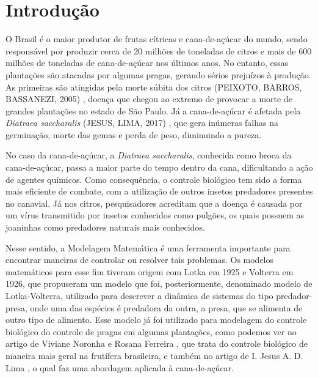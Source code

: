 \maketitle

\section{Introdução}

O Brasil é o maior produtor de frutas cítricas e cana-de-açúcar do mundo, sendo responsável por produzir cerca de 20 milhões de toneladas de citros e mais de 600 milhões de toneladas de cana-de-açúcar nos últimos anos. No entanto, essas plantações são atacadas por algumas pragas, gerando sérios prejuízos à produção. As primeiras são atingidas pela morte súbita dos citros (PEIXOTO,
BARROS, BASSANEZI, 2005) \cite{mp_lb_rb_2005}, doença que chegou ao extremo de provocar a morte de grandes plantações no estado de São Paulo. Já a cana-de-açúcar é afetada pela \textit{Diatraea saccharalis} (JESUS, LIMA, 2017) \cite{ij_al_2017}, que gera inúmeras falhas na germinação, morte das gemas e perda de peso, diminuindo a pureza.

No caso da cana-de-açúcar, a \textit{Diatraea saccharalis}, conhecida como broca da cana-de-açúcar, passa a maior parte do tempo dentro da cana, dificultando a ação de agentes químicos. Como consequência, o controle biológico tem sido a forma mais eficiente de combate, com a utilização de outros insetos predadores presentes no canavial. Já nos citros, pesquisadores acreditam que a doença é causada por um vírus transmitido por insetos conhecidos como pulgões, os quais possuem as joaninhas como predadores naturais mais conhecidos.

Nesse sentido, a Modelagem Matemática é uma ferramenta importante para encontrar maneiras de controlar ou resolver tais problemas. Os modelos matemáticos para esse fim tiveram origem com Lotka em 1925 e Volterra em 1926, que propuseram um modelo que foi, posteriormente, denominado modelo de Lotka-Volterra, utilizado para descrever a dinâmica de sistemas do tipo predador-presa, onde uma das espécies é predadora da outra, a presa, que se alimenta de outro tipo de alimento. Esse modelo já foi utilizado para modelagem do controle biológico do controle de pragas em algumas plantações, como podemos ver no artigo de Viviane Noronha e Rosana Ferreira \cite{vn_rf_2021}, que trata do controle biológico de maneira mais geral na frutífera brasileira, e também no artigo de I. Jesus  A. D. Lima \cite{ij_al_2017}, o qual faz uma abordagem aplicada à cana-de-açúcar.

